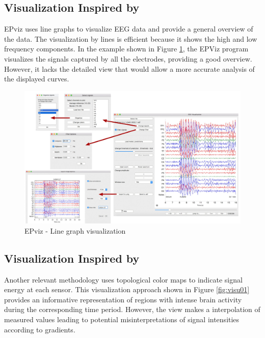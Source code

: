 \documentclass[format=sigconf]{acmart}
\begin{document}
		\subsection{Visualization Inspired by \cite{currey2023epviz}}
			\par EPviz uses line graphs to visualize EEG data \cite{currey2023epviz} and provide a general overview of the data. The visualization by lines is efficient because it shows the high and low frequency components. In the example shown in Figure \ref{fig:epviz00}, the EPViz program visualizes the signals captured by all the electrodes, providing a good overview. However, it lacks the detailed view that would allow a more accurate analysis of the displayed curves.			
		
			\begin{figure}[h]
				\centering
				\includegraphics[width=\linewidth]{../presentation/images/epviz00}
				\caption{EPviz - Line graph visualization}
				\label{fig:epviz00}
			\end{figure}
	
		\subsection{Visualization Inspired by \cite{9098189}}
			\par Another relevant methodology uses topological color maps to indicate signal energy at each sensor. This visualization approach shown in Figure \ref{fig:visu01} provides an informative representation of regions with intense brain activity during the corresponding time period. However, the view makes a interpolation of measured values leading to potential misinterpretations of signal intensities according to gradients.
			
\end{document}
